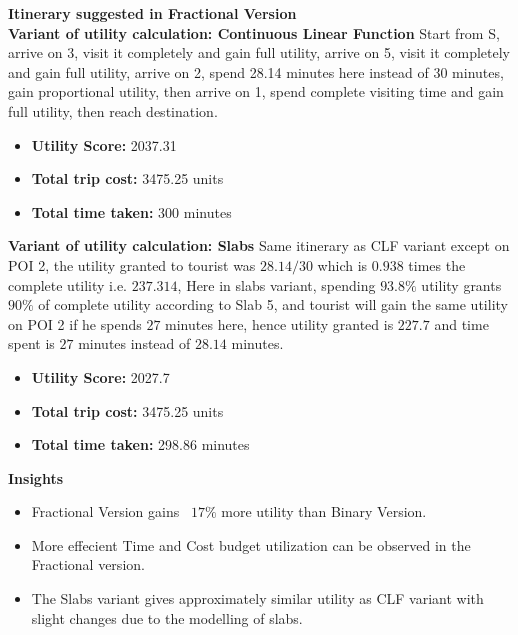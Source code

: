 {\noindent \textbf{Itinerary suggested in Fractional Version}\\
\textbf{Variant of utility calculation: Continuous Linear Function}
Start from S, arrive on 3, visit it completely and gain full utility, arrive on 5, visit it completely and gain full utility, arrive on 2, spend 28.14 minutes here instead of 30 minutes, gain proportional utility, then arrive on 1, spend complete visiting time and gain full utility, then reach destination.
\begin{itemize}
    \item \textbf{Utility Score:} 2037.31
    \item \textbf{Total trip cost:} 3475.25 units
    \item \textbf{Total time taken:} 300 minutes
\end{itemize}

\noindent \textbf{Variant of utility calculation: Slabs}
Same itinerary as CLF variant except on POI 2, the utility granted to tourist was $28.14/30$
which is $0.938$ times the complete utility i.e. $237.314$, Here in slabs variant, spending $93.8\%$ utility grants $90\%$ of complete utility according to Slab 5, and tourist will gain the same utility on POI 2 if he spends $27$ minutes here, hence utility granted is $227.7$ and time spent is $27$ minutes instead of $28.14$ minutes.
\begin{itemize}
    \item \textbf{Utility Score:} 2027.7
    \item \textbf{Total trip cost:} 3475.25 units
    \item \textbf{Total time taken:} 298.86 minutes
\end{itemize}

\noindent \textbf{Insights}
\begin{itemize}
    \item Fractional Version gains ~$17\%$ more utility than Binary Version.
    \item More effecient Time and Cost budget utilization can be observed in the Fractional version.
    \item The Slabs variant gives approximately similar utility as CLF variant with slight changes due to the modelling of slabs.
\end{itemize}

}
